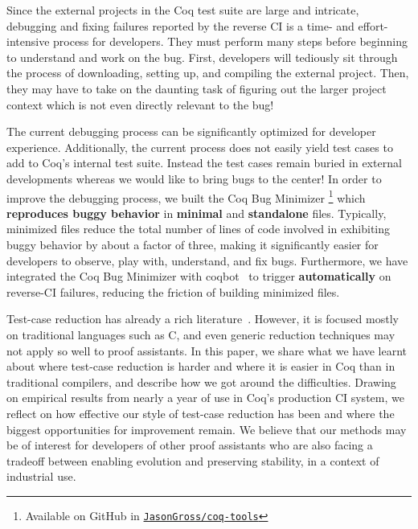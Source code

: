 \documentclass[a4paper,USenglish,cleveref,autoref,thm-restate]{lipics-v2021}
\begin{document}
Since the external projects in the Coq test suite are large and intricate, debugging and fixing failures reported by the reverse CI is a time- and effort-intensive process for developers.
They must perform many steps before beginning to understand and work on the bug.
First, developers will tediously sit through the process of downloading, setting up, and compiling the external project.
Then, they may have to take on the daunting task of figuring out the larger project context which is not even directly relevant to the bug!

The current debugging process can be significantly optimized for developer experience.
Additionally, the current process does not easily yield test cases to add to Coq's internal test suite.
Instead the test cases remain buried in external developments whereas we would like to bring bugs to the center!
In order to improve the debugging process, we built the Coq Bug Minimizer%
\footnote{%
Available on GitHub in \href{https://github.com/JasonGross/coq-tools}{\texttt{JasonGross/coq-tools}}%
}
which \textbf{reproduces buggy behavior} in \textbf{minimal} and \textbf{standalone} files.
Typically, minimized files reduce the total number of lines of code involved in exhibiting buggy behavior by about a factor of three, making it significantly easier for developers to observe, play with, understand, and fix bugs.
Furthermore, we have integrated the Coq Bug Minimizer with coqbot~\cite{zimmermann:hal-03479327} to trigger \textbf{automatically} on reverse-CI failures, reducing the friction of building minimized files.

Test-case reduction has already a rich literature~\cite{chen_survey_compiler_testing}. However, it is focused mostly on traditional languages such as C, and even generic reduction techniques may not apply so well to proof assistants.
%
In this paper, we share what we have learnt about where test-case reduction is harder and where it is easier in Coq than in traditional compilers, and describe how we got around the difficulties.
Drawing on empirical results from nearly a year of use in Coq's production CI system, we reflect on how effective our style of test-case reduction has been and where the biggest opportunities for improvement remain.
We believe that our methods may be of interest for developers of other proof assistants who are also facing a tradeoff between enabling evolution and preserving stability, in a context of industrial use.
\end{document}
